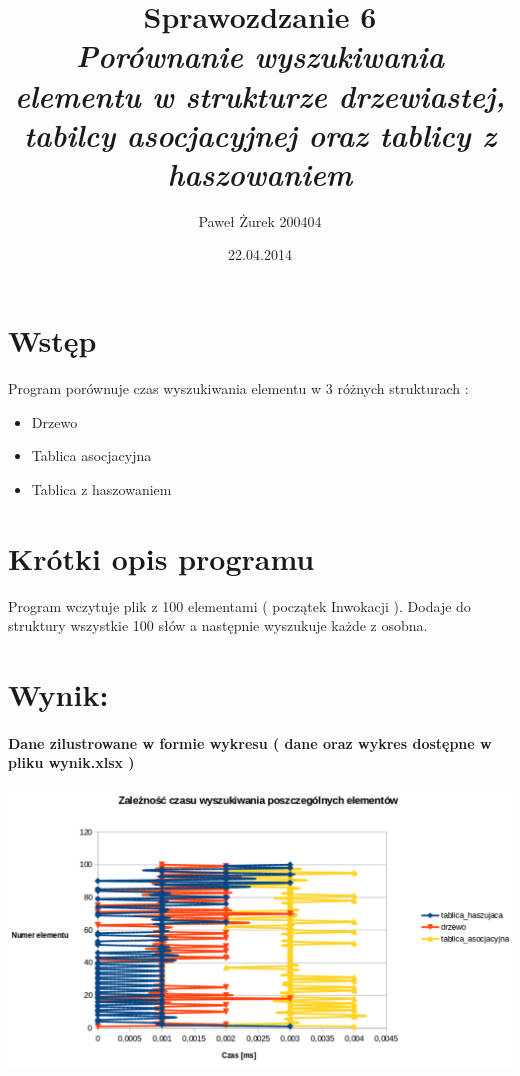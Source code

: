 \documentclass[10 pt]{article}
\title{Sprawozdzanie 6 \\ \emph{\textbf{Porównanie wyszukiwania elementu w strukturze drzewiastej, tabilcy asocjacyjnej oraz tablicy z haszowaniem}}}
\author{Paweł Żurek 200404}
\date{22.04.2014}
\begin{document}
\tableofcontents
\maketitle
\section{Wstęp}
Program porównuje czas wyszukiwania elementu w 3 różnych strukturach :
\begin{itemize}
\item Drzewo
\item Tablica asocjacyjna
\item Tablica z haszowaniem
\end{itemize}

\section{Krótki opis programu}
Program wczytuje plik z 100 elementami ( początek Inwokacji ). Dodaje do struktury wszystkie 100 słów a następnie wyszukuje każde z osobna.

\section{Wynik:}

\paragraph{Dane zilustrowane w formie wykresu ( dane oraz wykres dostępne w pliku wynik.xlsx ) \\}
\begin{center}
\includegraphics[scale=0.5]{wykres.pdf}
\end{center}
\end{document}

